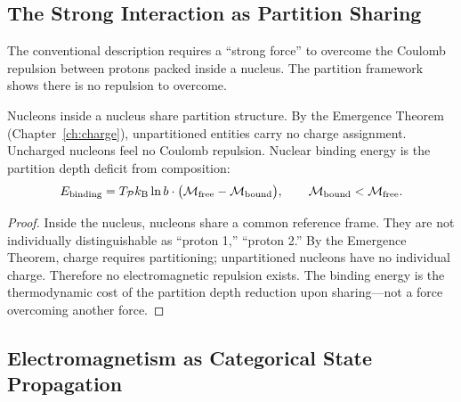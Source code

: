 \subsection{The Strong Interaction as Partition Sharing}

The conventional description requires a ``strong force'' to overcome the
Coulomb repulsion between protons packed inside a nucleus.  The partition
framework shows there is no repulsion to overcome.

\begin{theorem}
\label{thm:ch21-strong}
  Nucleons inside a nucleus share partition structure.  By the Emergence
  Theorem (Chapter~\ref{ch:charge}), unpartitioned entities carry no charge
  assignment.  Uncharged nucleons feel no Coulomb repulsion.  Nuclear binding
  energy is the partition depth deficit from composition:
  \begin{equation}
    E_{\mathrm{binding}} = T_{\mathcal{P}}k_{\mathrm{B}}\ln b \cdot
    \bigl(\mathcal{M}_{\mathrm{free}} - \mathcal{M}_{\mathrm{bound}}\bigr),
    \qquad \mathcal{M}_{\mathrm{bound}} < \mathcal{M}_{\mathrm{free}}.
  \end{equation}
\end{theorem}

\begin{proof}
  Inside the nucleus, nucleons share a common reference frame.  They are not
  individually distinguishable as ``proton 1,'' ``proton 2.''  By the Emergence
  Theorem, charge requires partitioning; unpartitioned nucleons have no
  individual charge.  Therefore no electromagnetic repulsion exists.  The
  binding energy is the thermodynamic cost of the partition depth reduction
  upon sharing---not a force overcoming another force.
\end{proof}

\subsection{Electromagnetism as Categorical State Propagation}

